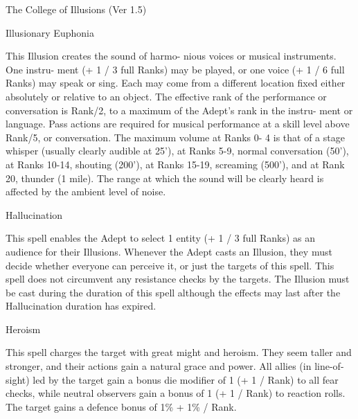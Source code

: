 \begin{Chapter}{The College of Illusions (Ver 1.5)}
\begin{spell}[S-6]{Illusionary Euphonia }

\begin{effects}
 This  Illusion  creates  the  sound  of  harmo-
nious  voices  or  musical  instruments.  One  instru-
ment  (+  1  /  3  full  Ranks)  may  be  played,  or  one 
voice (+ 1 / 6 full Ranks) may speak or sing. Each 
may  come  from  a  different  location  fixed  either 
absolutely  or  relative  to  an  object.  The  effective 
rank of the performance or conversation is Rank/2, 
to  a  maximum  of  the  Adept’s  rank  in  the  instru-
ment  or  language.  Pass  actions  are  required  for 
musical performance at a skill level above Rank/5, 
or conversation. The maximum volume at Ranks 0-
4 is that of a stage whisper (usually clearly audible 
at 25’), at Ranks 5-9, normal conversation (50’), at 
Ranks  10-14,  shouting  (200’),  at  Ranks  15-19, 
screaming (500’), and at Rank 20, thunder (1 mile). 
The range at which the sound will be clearly heard 
is affected by the ambient level of noise. 

\end{effects}
\end{spell}

\begin{spell}[S-7]{Hallucination }

\begin{effects}
 This  spell  enables  the  Adept  to  select  1 
entity (+ 1 / 3 full Ranks) as an audience for their 
Illusions.  Whenever  the  Adept  casts  an  Illusion, 
they must decide whether everyone can perceive it, 
or just the targets of this spell. This spell does not 
circumvent  any  resistance  checks  by  the  targets. 
The  Illusion  must  be  cast  during  the  duration  of 
this  spell  although  the  effects  may  last  after  the 
Hallucination duration has expired. 

\end{effects}
\end{spell}

\begin{spell}[S-8]{Heroism }

\begin{effects}
 This  spell  charges  the  target  with  great 
might and heroism. They seem taller and stronger, 
and  their  actions  gain  a  natural  grace  and  power. 
All allies  (in line-of-sight) led by the target gain a 
bonus  die  modifier  of  1  (+  1  /  Rank)  to  all  fear 
checks,  while  neutral  observers  gain  a  bonus  of  1 
(+  1  /  Rank)  to  reaction  rolls.  The  target  gains  a 
defence bonus of 1\% + 1\% / Rank. 


\end{effects}
\end{spell}
\end{Chapter}
